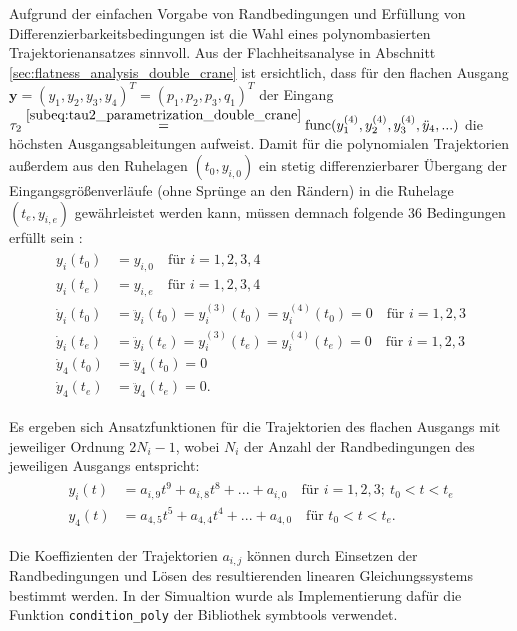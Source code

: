 Aufgrund der einfachen Vorgabe von Randbedingungen und Erfüllung von Differenzierbarkeitsbedingungen ist die Wahl eines polynombasierten Trajektorienansatzes sinnvoll. Aus der Flachheitsanalyse in Abschnitt \ref{sec:flatness_analysis_double_crane} ist ersichtlich, dass für den flachen Ausgang ${\mathbf{y} = (y_1, y_2, y_3, y_4)^T = (p_1, p_2, p_3, q_1)^T}$ der Eingang $\tau_2 \stackrel{\eqref{subeq:tau2_parametrization_double_crane}}{=} \mathrm{func}(y_1^{(4)}, y_2^{(4)}, y_3^{(4)}, \ddot{y}_4, ...)$ die höchsten Ausgangsableitungen aufweist. Damit für die polynomialen Trajektorien außerdem aus den Ruhelagen $(t_0, y_{i, 0})$  ein stetig differenzierbarer Übergang der Eingangsgrößenverläufe (ohne Sprünge an den Rändern) in die Ruhelage $(t_e, y_{i, e})$ gewährleistet werden kann, müssen demnach folgende 36 Bedingungen erfüllt sein \cite[S.~230]{NLRT_Roebenack}:
\begin{align}
	\begin{split}
	y_i(t_0) &= y_{i, 0}  \quad \text{für } i = 1,2,3,4 \\
	y_i(t_e) &= y_{i, e}  \quad \text{für } i = 1,2,3,4 \\
	\dot{y}_i(t_0) &= \ddot{y}_i(t_0) = y_i^{(3)}(t_0) = y_i^{(4)}(t_0) = 0 \quad \text{für } i = 1,2,3 \\
	\dot{y}_i(t_e) &= \ddot{y}_i(t_e) = y_i^{(3)}(t_e) = y_i^{(4)}(t_e) = 0 \quad \text{für } i = 1,2,3 \\
	\dot{y}_4(t_0) &= \ddot{y}_4(t_0) = 0 \\
	\dot{y}_4(t_e) &= \ddot{y}_4(t_e) = 0.
	\end{split}
\end{align}

Es ergeben sich Ansatzfunktionen für die Trajektorien des flachen Ausgangs mit jeweiliger Ordnung $2 N_i - 1$, wobei $N_i$ der Anzahl der Randbedingungen des jeweiligen Ausgangs entspricht:
\begin{align}
	\label{eq:polynomes_ref_trajectories}
	\begin{split}
	y_i(t) &= a_{i, 9} t^9 + a_{i, 8} t^8 + ... + a_{i, 0} \quad \text{für }  i = 1,2,3; \ t_0 < t < t_e \\
	y_4(t) &= a_{4, 5} t^5 + a_{4, 4} t^4 + ... + a_{4, 0} \quad \text{für } t_0 < t < t_e.
	\end{split}
\end{align}

Die Koeffizienten der Trajektorien $a_{i, j}$ können durch Einsetzen der Randbedingungen und Lösen des resultierenden linearen Gleichungssystems bestimmt werden. In der Simualtion wurde als Implementierung dafür die Funktion \texttt{condition\_poly} der Bibliothek symbtools verwendet.

